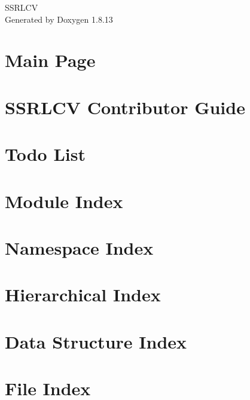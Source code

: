 \documentclass[twoside]{book}
\newcommand{\+}{\discretionary{\mbox{\scriptsize$\hookleftarrow$}}{}{}}
\newcommand{\clearemptydoublepage}{%
  \newpage{\pagestyle{empty}\cleardoublepage}%
}
\begin{document}
\hypersetup{pageanchor=false,
             bookmarksnumbered=true,
             pdfencoding=unicode
            }
\begin{titlepage}
\vspace*{7cm}
\begin{center}%
{\Large S\+S\+R\+L\+CV }\\
\vspace*{1cm}
{\large Generated by Doxygen 1.8.13}\\
\end{center}
\end{titlepage}
\clearemptydoublepage
{}
\tableofcontents
\clearemptydoublepage
{}
\hypersetup{pageanchor=true}

\chapter{Main Page}
\label{index}\hypertarget{index}{}
\chapter{S\+S\+R\+L\+CV Contributor Guide}
\label{md_CONTRIB}

\chapter{Todo List}
\label{todo}

\chapter{Module Index}

\chapter{Namespace Index}

\chapter{Hierarchical Index}

\chapter{Data Structure Index}

\chapter{File Index}

\end{document}
